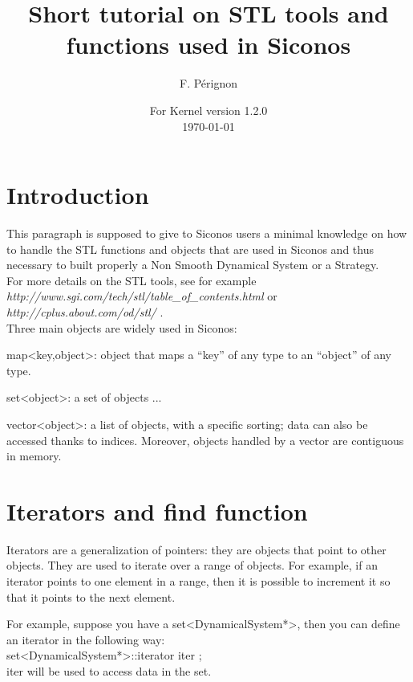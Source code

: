 \documentclass[10pt]{article}
\begin{document}
\thispagestyle{empty}
\title{Short tutorial on STL tools and functions used in Siconos}
\author{F. P\'erignon}

\date{For Kernel version 1.2.0 \\
 \today}
\maketitle

\pagestyle{fancy}

\section{Introduction}
This paragraph is supposed to give to Siconos users a minimal knowledge on how to handle the STL functions and objects that are used in Siconos and thus necessary
to built properly a Non Smooth Dynamical System or a Strategy. \\
For more details on the STL tools, see for example \textit{http://www.sgi.com/tech/stl/table\_of\_contents.html} or \textit{ http://cplus.about.com/od/stl/ }. \\
Three main objects are widely used in Siconos:
\bei
\item map<key,object>: object that maps a ``key'' of any type to an ``object'' of any type. 
\item set<object>: a set of objects ...
\item vector<object>: a list of objects, with a specific sorting; data can also be accessed thanks to indices. Moreover, objects handled by a vector are contiguous in memory.
\ei

\section{Iterators and find function}\label{ItAndFind}

Iterators are a generalization of pointers: they are objects that point to other objects. They are used to iterate over a range of objects.
For example, if an iterator points to one element in a range, then it is possible to increment it so that it points to the next element. 

For example, suppose you have a set<DynamicalSystem*>, then you can define an iterator in the following way: \\
set<DynamicalSystem*>::iterator iter ; \\
iter will be used to access data in the set. \\
\end{document}
